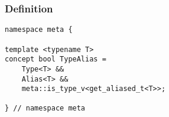 
\subsubsection{Definition}

\begin{verbatim}
namespace meta {

template <typename T>
concept bool TypeAlias =
	Type<T> &&
	Alias<T> &&
	meta::is_type_v<get_aliased_t<T>>;

} // namespace meta
\end{verbatim}

